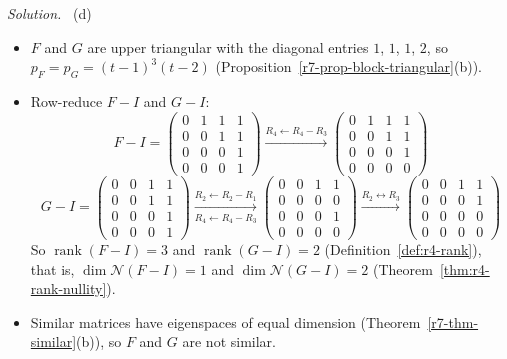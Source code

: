 \documentclass[12pt]{article}
\DeclareMathOperator{\rank}{rank}
\theoremstyle{definition}
\newenvironment{solution}{\par\noindent\textit{Solution.}\ }{\par\smallskip}
\begin{document}
\begin{solution}
(d)
\begin{itemize}
\item \(F\) and \(G\) are upper triangular with the diagonal entries \(1\), \(1\), \(1\), \(2\), so
\(p_F=p_G=(t-1)^3(t-2)\) (Proposition~\ref{r7-prop-block-triangular}(b)).
\item Row-reduce \(F-I\) and \(G-I\):
\[
F-I=\begin{pmatrix}0&1&1&1\\0&0&1&1\\0&0&0&1\\0&0&0&1\end{pmatrix}
\xrightarrow{R_4\leftarrow R_4-R_3}
\begin{pmatrix}0&1&1&1\\0&0&1&1\\0&0&0&1\\0&0&0&0\end{pmatrix}
\]
\[
G-I=\begin{pmatrix}0&0&1&1\\0&0&1&1\\0&0&0&1\\0&0&0&1\end{pmatrix}
\xrightarrow[R_4\leftarrow R_4-R_3]{R_2\leftarrow R_2-R_1}
\begin{pmatrix}0&0&1&1\\0&0&0&0\\0&0&0&1\\0&0&0&0\end{pmatrix}
\xrightarrow{R_2\leftrightarrow R_3}
\begin{pmatrix}0&0&1&1\\0&0&0&1\\0&0&0&0\\0&0&0&0\end{pmatrix}
\]
So \(\rank(F-I)=3\) and \(\rank(G-I)=2\) (Definition~\ref{def:r4-rank}), that is, \(\dim\mathcal N(F-I)=1\) and
\(\dim\mathcal N(G-I)=2\) (Theorem~\ref{thm:r4-rank-nullity}).
\item Similar matrices have eigenspaces of equal dimension (Theorem~\ref{r7-thm-similar}(b)), so \(F\) and \(G\) are not
similar.
\end{itemize}
\end{solution}
\end{document}
